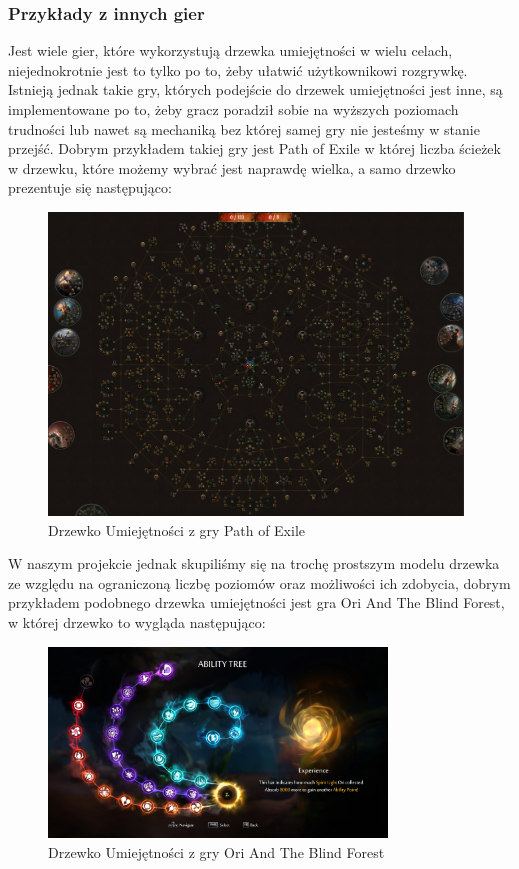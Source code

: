 \documentclass[oneside,polski,logo]{amuthesis}
\begin{document}
\subsubsection{Przykłady z innych gier}
Jest wiele gier, które wykorzystują drzewka umiejętności w wielu celach, niejednokrotnie jest to tylko po to, żeby ułatwić użytkownikowi rozgrywkę. Istnieją jednak takie gry, których podejście do drzewek umiejętności jest inne, są implementowane po to, żeby gracz poradził sobie na wyższych poziomach trudności lub nawet są mechaniką bez której samej gry nie jesteśmy w stanie przejść. Dobrym przykładem takiej gry jest Path of Exile w której liczba ścieżek w drzewku, które możemy wybrać jest naprawdę wielka, a samo drzewko prezentuje się następująco:
\begin{figure}[h]
	\centering
	\includegraphics[width=11cm]{images/kozubal/poe.png}
	\caption{Drzewko Umiejętności z gry Path of Exile \cite{poeskills} }
\end{figure}
\newpage
W naszym projekcie jednak skupiliśmy się na trochę prostszym modelu drzewka ze względu na ograniczoną liczbę poziomów oraz możliwości ich zdobycia, dobrym przykładem podobnego drzewka umiejętności jest gra Ori And The Blind Forest, w której drzewko to wygląda następująco:
\begin{figure}[h]
	\centering
	\includegraphics[width=9cm]{images/kozubal/ori.jpg}
	\caption{Drzewko Umiejętności z gry Ori And The Blind Forest}
\end{figure}
\end{document}
